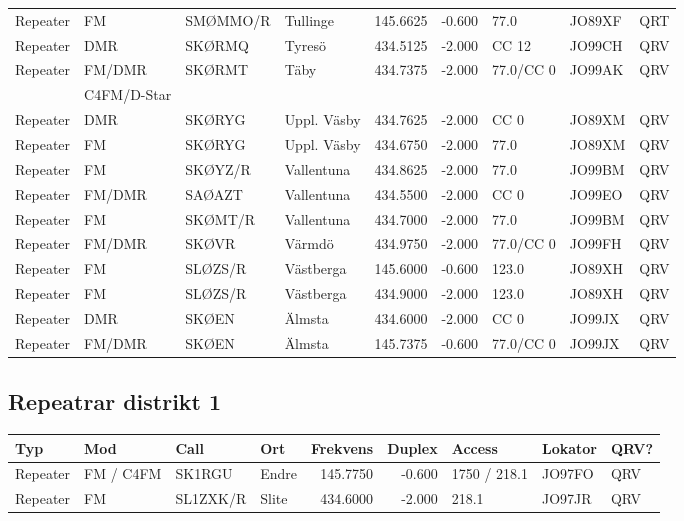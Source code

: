\begin{longtable}{llllrrlll}
Repeater & FM          & SMØMMO/R & Tullinge    & 145.6625     & -0.600     & 77.0       & JO89XF      & QRT      \\
Repeater & DMR         & SKØRMQ   & Tyresö      & 434.5125     & -2.000     & CC 12      & JO99CH      & QRV      \\
Repeater & FM/DMR      & SKØRMT   & Täby        & 434.7375     & -2.000     & 77.0/CC 0  & JO99AK      & QRV      \\
         & C4FM/D-Star &          &             &              &            &            &             &          \\
Repeater & DMR         & SKØRYG   & Uppl. Väsby & 434.7625     & -2.000     & CC 0       & JO89XM      & QRV      \\
Repeater & FM          & SKØRYG   & Uppl. Väsby & 434.6750     & -2.000     & 77.0       & JO89XM      & QRV      \\
Repeater & FM          & SKØYZ/R  & Vallentuna  & 434.8625     & -2.000     & 77.0       & JO99BM      & QRV      \\
Repeater & FM/DMR      & SAØAZT   & Vallentuna  & 434.5500     & -2.000     & CC 0       & JO99EO      & QRV      \\
Repeater & FM          & SKØMT/R  & Vallentuna  & 434.7000     & -2.000     & 77.0       & JO99BM      & QRV      \\
Repeater & FM/DMR      & SKØVR    & Värmdö      & 434.9750     & -2.000     & 77.0/CC 0  & JO99FH      & QRV      \\
Repeater & FM          & SLØZS/R  & Västberga   & 145.6000     & -0.600     & 123.0      & JO89XH      & QRV      \\
Repeater & FM          & SLØZS/R  & Västberga   & 434.9000     & -2.000     & 123.0      & JO89XH      & QRV      \\
Repeater & DMR         & SKØEN    & Älmsta      & 434.6000     & -2.000     & CC 0       & JO99JX      & QRV      \\
Repeater & FM/DMR      & SKØEN    & Älmsta      & 145.7375     & -0.600     & 77.0/CC 0  & JO99JX      & QRV      \\
\end{longtable}
\normalsize


\subsection{Repeatrar distrikt 1}

\scriptsize

\begin{longtable}{llllrrlll}
\bf Typ  & \bf Mod     & \bf Call & \bf Ort     & \bf Frekvens & \bf Duplex & \bf Access & \bf Lokator & \bf QRV? \\ \hline
Repeater   & FM / C4FM & SK1RGU   & Endre        & 145.7750     & -0.600     & 1750 / 218.1 & JO97FO      & QRV      \\
Repeater   & FM        & SL1ZXK/R & Slite        & 434.6000     & -2.000     & 218.1        & JO97JR      & QRV      \\
\end{longtable}

